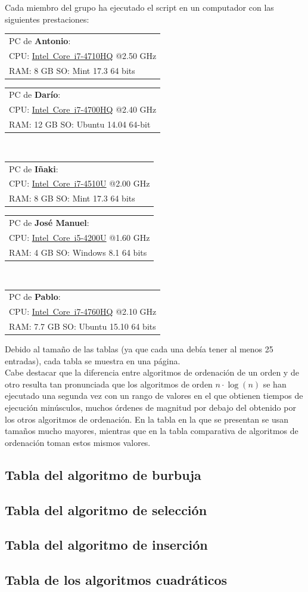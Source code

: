 \documentclass[a4paper, 11pt]{article}
\makeatletter
\newcommand{\spec}[5]{
\bgroup
\def\arraystretch{1.2}
\begin{tabular}{|l|}
\hline
PC de \textbf{#1}:\\
CPU: #2 @#3 GHz\\RAM: #4 GB \hspace{0.8cm} SO: #5 \\
\hline
\end{tabular}
\egroup
\vspace*{0.2cm}
}
\makeatother
\begin{document}
Cada miembro del grupo ha ejecutado el script en un computador con las siguientes prestaciones:

\noindent
\spec{Antonio}{\href{http://ark.intel.com/products/78930}{Intel\textregistered\ Core\texttrademark\ i7-4710HQ}}{2.50}{8}{Mint 17.3 64 bits}
\spec{Darío}{\href{http://ark.intel.com/products/75116}{Intel\textregistered\ Core\texttrademark\ i7-4700HQ}}{2.40}{12}{Ubuntu 14.04 64-bit} \\
\spec{Iñaki}{\href{http://ark.intel.com/products/81015}{Intel\textregistered\ Core\texttrademark\ i7-4510U}}{2.00}{8}{Mint 17.3 64 bits}
\spec{José Manuel}{\href{http://ark.intel.com/es-es/products/75459/}{Intel\textregistered\ Core\texttrademark\ i5-4200U}}{1.60}{4}{Windows 8.1 64 bits} \\
\spec{Pablo}{\href{http://ark.intel.com/es-es/products/76090/}{Intel\textregistered\ Core\texttrademark\ i7-4760HQ}}{2.10}{7.7}{Ubuntu 15.10 64 bits}

Debido al tamaño de las tablas (ya que cada una debía tener al menos 25 entradas),
cada tabla se muestra en una página. \\

Cabe destacar que la diferencia entre algoritmos de ordenación de un orden y de
otro resulta tan pronunciada que los algoritmos de orden $n \cdot \log (n)$ se
han ejecutado una segunda vez con un rango de valores en el que obtienen tiempos
de ejecución minúsculos, muchos órdenes de magnitud por debajo del obtenido por
los otros algoritmos de ordenación. En la tabla en la que se presentan se usan
tamaños mucho mayores, mientras que en la tabla comparativa de algoritmos de
ordenación toman estos mismos valores.

\subsection{Tabla del algoritmo de burbuja}


\subsection{Tabla del algoritmo de selección}


\subsection{Tabla del algoritmo de inserción}


\newpage
\subsection{Tabla de los algoritmos cuadráticos}
\end{document}
